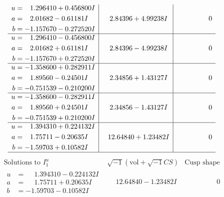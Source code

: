 \documentclass[1p]{elsarticle_modified}
\theoremstyle{definition}
\newcommand{\I}{\sqrt{-1}}
\begin{document}
$$\begin{array}{c|c|c}
\begin{aligned}
u &= \phantom{-}1.296410 + 0.456800 I \\
a &= \phantom{-}2.01682 - 0.61181 I \\
b &= -1.157670 - 0.272520 I\end{aligned}
 & \phantom{-}2.84396 + 4.99238 I & \phantom{-0.000000 } 0 \\ \hline\begin{aligned}
u &= \phantom{-}1.296410 - 0.456800 I \\
a &= \phantom{-}2.01682 + 0.61181 I \\
b &= -1.157670 + 0.272520 I\end{aligned}
 & \phantom{-}2.84396 - 4.99238 I & \phantom{-0.000000 } 0 \\ \hline\begin{aligned}
u &= -1.358600 + 0.282911 I \\
a &= \phantom{-}1.89560 - 0.24501 I \\
b &= -0.751539 - 0.210200 I\end{aligned}
 & \phantom{-}2.34856 + 1.43127 I & \phantom{-0.000000 } 0 \\ \hline\begin{aligned}
u &= -1.358600 - 0.282911 I \\
a &= \phantom{-}1.89560 + 0.24501 I \\
b &= -0.751539 + 0.210200 I\end{aligned}
 & \phantom{-}2.34856 - 1.43127 I & \phantom{-0.000000 } 0 \\ \hline\begin{aligned}
u &= \phantom{-}1.394310 + 0.224132 I \\
a &= \phantom{-}1.75711 - 0.20635 I \\
b &= -1.59703 + 0.10582 I\end{aligned}
 & \phantom{-}12.64840 + 1.23482 I & \phantom{-0.000000 } 0\\
 \hline 
 \end{array}$$\newpage$$\begin{array}{c|c|c}  
\text{Solutions to }I^u_{1}& \I (\text{vol} + \sqrt{-1}CS) & \text{Cusp shape}\\
 \hline 
\begin{aligned}
u &= \phantom{-}1.394310 - 0.224132 I \\
a &= \phantom{-}1.75711 + 0.20635 I \\
b &= -1.59703 - 0.10582 I\end{aligned}
 & \phantom{-}12.64840 - 1.23482 I & \phantom{-0.000000 } 0 \\ \hline\begin{aligned}

\end{aligned}
\end{array}$$
\end{document}
